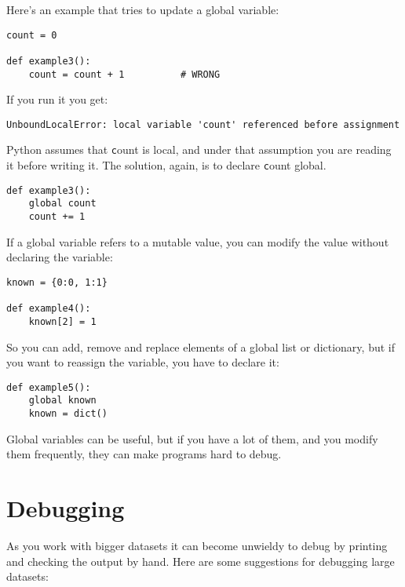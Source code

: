 \documentclass[
DIV=11,
fontsize=12,
twoside,
headinclude=false,
titlepage=firstiscover,
abstract=true,
headsepline=true,
footsepline=true,
chapterprefix=true, %
headings=big,
bibliography=totoc,%
captions=tableheading
]{scrbook}
\theoremstyle{definition}
\begin{document}
Here's an example that tries to update a global variable:

\begin{lstlisting}
count = 0

def example3():
    count = count + 1          # WRONG
\end{lstlisting}
%
If you run it you get:

\begin{lstlisting}
UnboundLocalError: local variable 'count' referenced before assignment
\end{lstlisting}
%
Python assumes that {\texttt count} is local, and under that assumption
you are reading it before writing it.  The solution, again,
is to declare {\texttt count} global.

\begin{lstlisting}
def example3():
    global count
    count += 1
\end{lstlisting}
%
If a global variable refers to a mutable value, you can modify
the value without declaring the variable:

\begin{lstlisting}
known = {0:0, 1:1}

def example4():
    known[2] = 1
\end{lstlisting}
%
So you can add, remove and replace elements of a global list or
dictionary, but if you want to reassign the variable, you
have to declare it:

\begin{lstlisting}
def example5():
    global known
    known = dict()
\end{lstlisting}
%
Global variables can be useful, but if you have a lot of them,
and you modify them frequently, they can make programs
hard to debug.


\section{Debugging}

As you work with bigger datasets it can become unwieldy to
debug by printing and checking the output by hand.  Here are some
suggestions for debugging large datasets:
\end{document}

